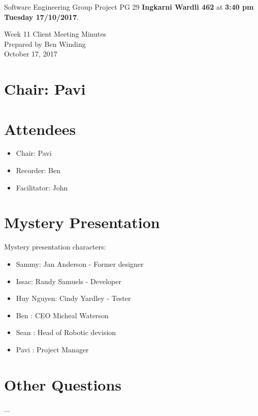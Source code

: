\documentclass[11pt, a4paper]{article}
\begin{document}
\noindent Software Engineering Group Project PG 29 {\bf Ingkarni Wardli 462} at {\bf 3:40 pm Tuesday 17/10/2017}.
\begin{center}
\huge Week 11 Client Meeting Minutes \\
\small Prepared by Ben Winding \\
\small October 17, 2017 \\
\end{center}
\section*{Chair: Pavi}

\section{Attendees}
\begin{itemize}
\item Chair: Pavi
\item Recorder: Ben
\item Facilitator: John
\end{itemize}


\section{Mystery Presentation}
Mystery presentation characters:
\begin{itemize}
	\item Sammy: Jan Anderson - Former designer
	\item Issac: Randy Samuels - Developer
	\item Huy Nguyen: Cindy Yardley - Tester
	\item Ben : CEO Micheal Waterson
	\item Sean : Head of Robotic devision
	\item Pavi : Project Manager
\end{itemize}

\section{Other Questions}
...
\end{document}
